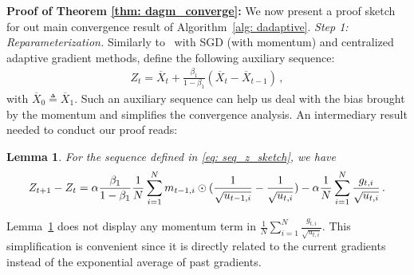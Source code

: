 \documentclass{article} %
\newtheorem{lemma}{Lemma}
\begin{document}
\textbf{Proof of Theorem \ref{thm: dagm_converge}:} 
We now present a proof sketch for out main convergence result of Algorithm~\ref{alg: dadaptive}. 
\textsl{Step 1: Reparameterization.} \hspace{0.01in} Similarly to~\citet{yan2018unified, chen2018convergence} with SGD (with momentum) and centralized adaptive gradient methods, define the following auxiliary sequence:
 \begin{align}\label{eq: seq_z_sketch}
 Z_{t} = \overline X_t + \frac{\beta_1}{1-\beta_1} (\overline X_t - \overline X_{t-1}) \, ,
 \end{align}
with $\overline X_{0} \triangleq \overline X_1$.
Such an auxiliary sequence can help us deal with the bias brought by the momentum and simplifies the convergence analysis. 
 An intermediary result needed to conduct our proof reads:
 \begin{lemma}\label{lem: z_diff} 
	For the sequence defined in \eqref{eq: seq_z_sketch}, we have
	\begin{align}\notag
	Z_{t+1} - Z_t = \alpha \frac{\beta_1}{1-\beta_1}  \frac{1}{N} \sum_{i=1}^N m_{t-1	,i} \odot (\frac{1}{\sqrt{u_{t-1,i}}} - \frac{1}{\sqrt{u_{t,i}}}) - \alpha \frac{1}{N} \sum_{i=1}^N \frac{g_{t,i}}{\sqrt{u_{t,i}}} \, .
	\end{align}
\end{lemma}
 Lemma~\ref{lem: z_diff} does not display any momentum term in $\frac{1}{N} \sum_{i=1}^N \frac{g_{t,i}}{\sqrt{u_{t,i}}}$.
 This simplification is convenient since it is directly related to the current gradients instead of the exponential average of past gradients.
 
\end{document}

